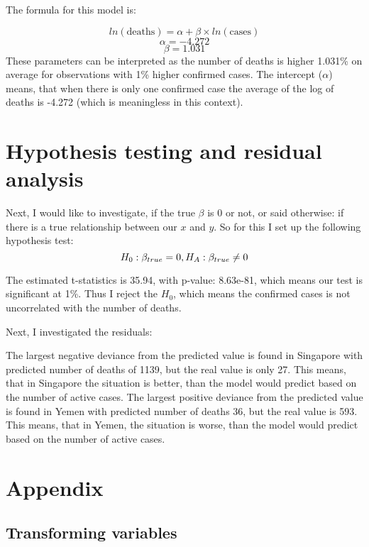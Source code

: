 \documentclass[
]{article}
\begin{document}
The formula for this model is:

\[ln(\text{deaths}) = \alpha + \beta \times ln(\text{cases})\]
\[\alpha = -4.272\] \[\beta = 1.031\] These parameters can be
interpreted as the number of deaths is higher 1.031\% on average for
observations with 1\% higher confirmed cases. The intercept (\(\alpha\))
means, that when there is only one confirmed case the average of the log
of deaths is -4.272 (which is meaningless in this context).

\hypertarget{hypothesis-testing-and-residual-analysis}{%
\section{Hypothesis testing and residual
analysis}\label{hypothesis-testing-and-residual-analysis}}

Next, I would like to investigate, if the true \(\beta\) is 0 or not, or
said otherwise: if there is a true relationship between our \(x\) and
\(y\). So for this I set up the following hypothesis test:
\[H_0 : \beta_{true}=0, \space H_A : \beta_{true}\neq 0\]

The estimated t-statistics is 35.94, with p-value: 8.63e-81, which means
our test is significant at 1\%. Thus I reject the \(H_0\), which means
the confirmed cases is not uncorrelated with the number of deaths.

Next, I investigated the residuals:

The largest negative deviance from the predicted value is found in
Singapore with predicted number of deaths of 1139, but the real value is
only 27. This means, that in Singapore the situation is better, than the
model would predict based on the number of active cases. The largest
positive deviance from the predicted value is found in Yemen with
predicted number of deaths 36, but the real value is 593. This means,
that in Yemen, the situation is worse, than the model would predict
based on the number of active cases.

\hypertarget{appendix}{%
\section{Appendix}\label{appendix}}

\hypertarget{transforming-variables}{%
\subsection{Transforming variables}\label{transforming-variables}}
\end{document}
